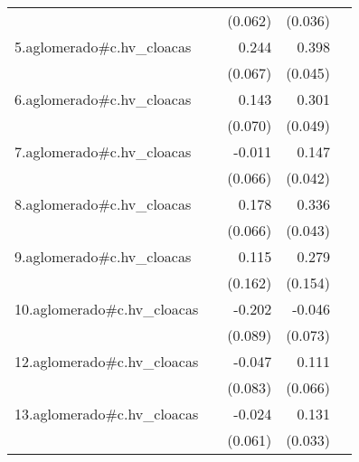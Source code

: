 {\begin{longtable}{l*{4}{D{.}{.}{-1}}}
            &                     &     (0.062)         &     (0.036)         &                     \\
\addlinespace
5.aglomerado#c.hv\_cloacas&                     &       0.244\sym{***}&       0.398\sym{***}&                     \\
            &                     &     (0.067)         &     (0.045)         &                     \\
\addlinespace
6.aglomerado#c.hv\_cloacas&                     &       0.143\sym{*}  &       0.301\sym{***}&                     \\
            &                     &     (0.070)         &     (0.049)         &                     \\
\addlinespace
7.aglomerado#c.hv\_cloacas&                     &      -0.011         &       0.147\sym{***}&                     \\
            &                     &     (0.066)         &     (0.042)         &                     \\
\addlinespace
8.aglomerado#c.hv\_cloacas&                     &       0.178\sym{**} &       0.336\sym{***}&                     \\
            &                     &     (0.066)         &     (0.043)         &                     \\
\addlinespace
9.aglomerado#c.hv\_cloacas&                     &       0.115         &       0.279         &                     \\
            &                     &     (0.162)         &     (0.154)         &                     \\
\addlinespace
10.aglomerado#c.hv\_cloacas&                     &      -0.202\sym{*}  &      -0.046         &                     \\
            &                     &     (0.089)         &     (0.073)         &                     \\
\addlinespace
12.aglomerado#c.hv\_cloacas&                     &      -0.047         &       0.111         &                     \\
            &                     &     (0.083)         &     (0.066)         &                     \\
\addlinespace
13.aglomerado#c.hv\_cloacas&                     &      -0.024         &       0.131\sym{***}&                     \\
            &                     &     (0.061)         &     (0.033)         &                     \\

\end{longtable}}

